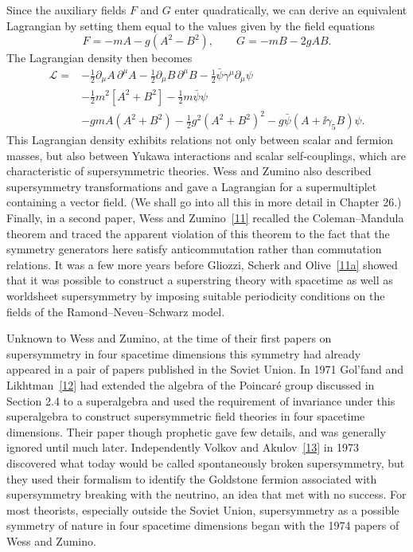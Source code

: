 Since the auxiliary fields \(F\) and \(G\) enter quadratically, we can derive
an equivalent Lagrangian by setting them equal to the values given by the
field equations
\begin{equation}
F=-mA-g(A^2-B^2),
\qquad
G=-mB-2gAB.
\tag{24.2.10}\label{eq:24.2.10}
\end{equation}
The Lagrangian density then becomes
\begin{equation}
\begin{aligned}
\mathcal L={}&
-\frac12\partial_\mu A\,\partial^\mu A
-\frac12\partial_\mu B\,\partial^\mu B
-\frac12\bar\psi\gamma^\mu\partial_\mu\psi
\\
&-\frac12m^2\left[A^2+B^2\right]-\frac12m\bar\psi\psi
\\
&-gmA(A^2+B^2)-\frac12g^2(A^2+B^2)^2
-g\bar\psi(A+\ii\gamma_5B)\psi.
\end{aligned}
\tag{24.2.11}\label{eq:24.2.11}
\end{equation}
This Lagrangian density exhibits relations not only between scalar and
fermion masses, but also between Yukawa interactions and scalar
self-couplings, which are characteristic of supersymmetric theories. Wess and
Zumino also described supersymmetry transformations and gave a Lagrangian for
a supermultiplet containing a vector field. (We shall go into all this in more
detail in Chapter 26.) Finally, in a second paper, Wess and
Zumino~\hyperref[ch24-ref-11]{[11]} recalled the Coleman--Mandula theorem and
traced the apparent violation of this theorem to the fact that the symmetry
generators here satisfy anticommutation rather than commutation relations. It
was a few more years before Gliozzi, Scherk and
Olive~\hyperref[ch24-ref-11a]{[11a]} showed that it was possible to construct
a superstring theory with spacetime as well as worldsheet supersymmetry by
imposing suitable periodicity conditions on the fields of the
Ramond--Neveu--Schwarz model.

Unknown to Wess and Zumino, at the time of their first papers on supersymmetry
in four spacetime dimensions this symmetry had already appeared in a pair of
papers published in the Soviet Union. In 1971 Gol'fand and
Likhtman~\hyperref[ch24-ref-12]{[12]} had extended the algebra of the Poincaré
group discussed in Section 2.4 to a superalgebra and used the requirement of
invariance under this superalgebra to construct supersymmetric field theories
in four spacetime dimensions. Their paper though prophetic gave few details,
and was generally ignored until much later. Independently Volkov and
Akulov~\hyperref[ch24-ref-13]{[13]} in 1973 discovered what today would be
called spontaneously broken supersymmetry, but they used their formalism to
identify the Goldstone fermion associated with supersymmetry breaking with
the neutrino, an idea that met with no success. For most theorists, especially
outside the Soviet Union, supersymmetry as a possible symmetry of nature in
four spacetime dimensions began with the 1974 papers of Wess and Zumino.
